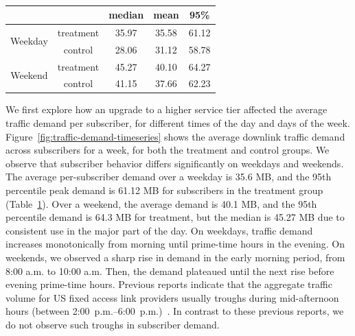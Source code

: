 \begin{table}[t]
\centering
\begin{tabular}{c c | c c c |}
\cline{3-5}
        &           & median & mean  & 95\%  \\ \hline
\multicolumn{1}{|c|}{\multirow{2}{*}{Weekday}} 	& treatment & 35.97  & 35.58 & 61.12 \\
\multicolumn{1}{|c|}{}					        & control   & 28.06  & 31.12 & 58.78 \\\hline
\multicolumn{1}{|c|}{\multirow{2}{*}{Weekend}}	& treatment & 45.27  & 40.10 & 64.27 \\
\multicolumn{1}{|c|}{} 					        & control   & 41.15  & 37.66 & 62.23 \\\hline
\end{tabular}
\caption{}
\label{tab:traffic-demand-description}
\end{table}

We first explore how an upgrade to a higher service tier affected the
average traffic demand per subscriber, for different times of the day
and days of the week.  Figure~\ref{fig:traffic-demand-timeseries} shows
the average downlink traffic demand across subscribers for a week, for
both the treatment and control groups. We observe that subscriber
behavior differs significantly on weekdays and weekends.  The average
per-subscriber demand over a weekday is 35.6 MB, and the 95th percentile
peak demand is 61.12 MB for subscribers in the treatment group
(Table~\ref{tab:traffic-demand-description}).  Over a weekend, the
average demand is 40.1 MB, and the 95th percentile demand is 64.3 MB for
treatment, but the median is 45.27 MB due to consistent use in the major
part of the day.  On weekdays, traffic demand increases monotonically
from morning until prime-time hours in the evening. On weekends, we
observed a sharp rise in demand in the early morning period, from 8:00
a.m. to 10:00 a.m. Then, the demand plateaued until the next rise
before evening prime-time hours. Previous reports indicate that
the aggregate traffic volume for US fixed access link providers usually
troughs during mid-afternoon hours (between
2:00~p.m.--6:00~p.m.)~\cite{sandvine20141h}. In contrast to these
  previous reports, we do not observe such troughs in 
subscriber demand.

